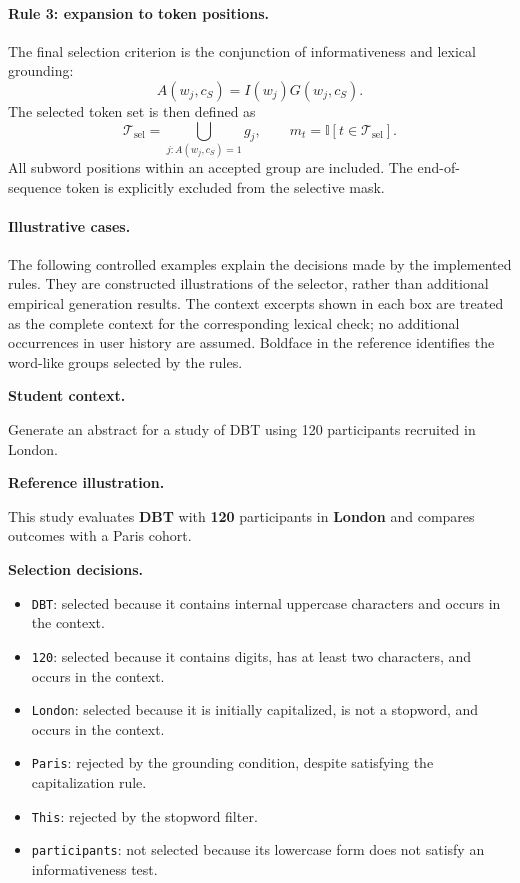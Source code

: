 \documentclass{article} %
\begin{document}
\paragraph{Rule 3: expansion to token positions.}
The final selection criterion is the conjunction of informativeness and lexical grounding:
\begin{equation}
A(w_j,c_S)=I(w_j)G(w_j,c_S).
\end{equation}
The selected token set is then defined as
\begin{equation}
\mathcal{T}_{\mathrm{sel}}
=
\bigcup_{j:A(w_j,c_S)=1}g_j,
\qquad
m_t=\mathbb{I}[t\in\mathcal{T}_{\mathrm{sel}}].
\label{eq:focal_selected_set}
\end{equation}
All subword positions within an accepted group are included. The end-of-sequence token is explicitly excluded from the selective mask.

\paragraph{Illustrative cases.}
The following controlled examples explain the decisions made by the implemented rules. They are constructed illustrations of the selector, rather than additional empirical generation results. The context excerpts shown in each box are treated as the complete context for the corresponding lexical check; no additional occurrences in user history are assumed. Boldface in the reference identifies the word-like groups selected by the rules.

\begin{tcolorbox}[
    colback=gray!5,
    colframe=black!45,
    title={Case 1: Abstract generation---method names and numerical information},
    breakable,
    fontupper=\small
]
\textbf{Student context.}

Generate an abstract for a study of DBT using 120 participants recruited in London.

\medskip
\textbf{Reference illustration.}

This study evaluates \textbf{DBT} with \textbf{120} participants in \textbf{London} and compares outcomes with a Paris cohort.

\medskip
\textbf{Selection decisions.}
\begin{itemize}
    \item \texttt{DBT}: selected because it contains internal uppercase characters and occurs in the context.
    \item \texttt{120}: selected because it contains digits, has at least two characters, and occurs in the context.
    \item \texttt{London}: selected because it is initially capitalized, is not a stopword, and occurs in the context.
    \item \texttt{Paris}: rejected by the grounding condition, despite satisfying the capitalization rule.
    \item \texttt{This}: rejected by the stopword filter.
    \item \texttt{participants}: not selected because its lowercase form does not satisfy an informativeness test.
\end{itemize}
\end{tcolorbox}
\end{document}
